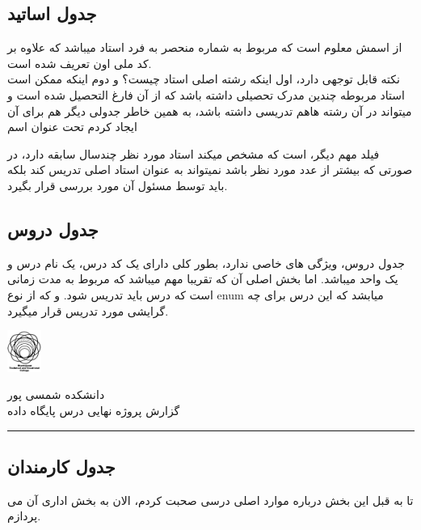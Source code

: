 \documentclass{article}
\begin{document}
\subsection{جدول اساتید}
از اسمش معلوم است که مربوط به شماره منحصر به فرد استاد میباشد که علاوه بر کد ملی اون تعریف شده است.\\

نکته قابل توجهی دارد، اول اینکه رشته اصلی استاد چیست؟ و دوم اینکه ممکن است استاد مربوطه چندین
مدرک تحصیلی داشته باشد که از آن فارغ التحصیل شده است و میتواند در آن رشته هاهم 
تدریسی داشته باشد، به همین خاطر جدولی دیگر هم برای آن ایجاد کردم تحت عنوان اسم


فیلد مهم دیگر،
است که مشخص میکند استاد مورد نظر چندسال سابقه دارد، در صورتی که بیشتر از عدد مورد نظر باشد نمیتواند به عنوان
استاد اصلی تدریس کند بلکه باید توسط مسئول آن مورد بررسی قرار بگیرد.



\subsection{جدول دروس}
جدول دروس، ویژگی های خاصی ندارد، بطور کلی دارای یک کد درس، یک نام درس و یک واحد میباشد.
اما بخش اصلی آن که تقریبا مهم میباشد
که مربوط به مدت زمانی است که درس باید تدریس شود.
و 
که از نوع enum
میابشد که این درس برای چه گرایشی مورد تدریس قرار میگیرد.


\begin{minipage}{0.1\textwidth}%
  \includegraphics[width=1.1cm]{tvu.png}
  \end{minipage}%
  \hfill%
  \begin{minipage}{0.9\textwidth}\raggedleft
  دانشکده شمسی پور\\
  گزارش پروژه نهایی درس پایگاه داده\\
  \end{minipage}

\par\noindent\rule{\textwidth}{3pt}


\subsection{جدول کارمندان}
تا به قبل این بخش درباره موارد اصلی درسی صحبت کردم، الان به بخش اداری آن
می پردازم.\\
\end{document}
